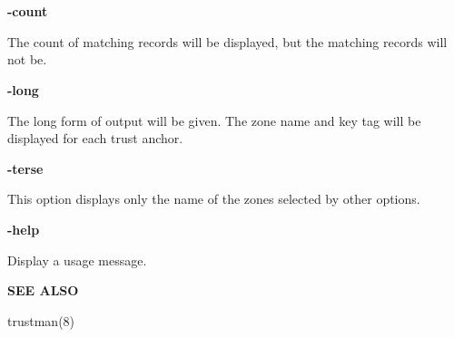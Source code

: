 \begin{description}

\item {\bf -count}\verb" "

The count of matching records will be displayed, but the matching records
will not be.

\item {\bf -long}\verb" "

The long form of output will be given.  The zone name and key tag will be
displayed for each trust anchor.

\item {\bf -terse}\verb" "

This option displays only the name of the zones selected by other options.

\item {\bf -help}\verb" "

Display a usage message.

\end{description}

{\bf SEE ALSO}

trustman(8)

